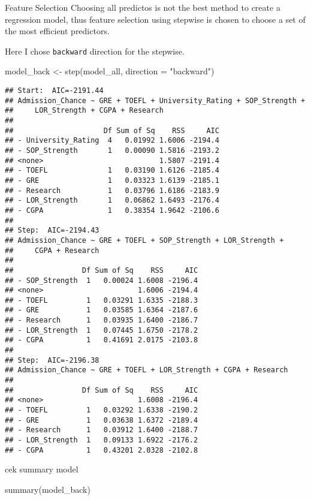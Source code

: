 \documentclass[
  ignorenonframetext,
]{beamer}
\newenvironment{Shaded}{\begin{snugshade}}{\end{snugshade}}
\newcommand{\AttributeTok}[1]{\textcolor[rgb]{0.77,0.63,0.00}{#1}}
\newcommand{\FunctionTok}[1]{\textcolor[rgb]{0.00,0.00,0.00}{#1}}
\newcommand{\NormalTok}[1]{#1}
\newcommand{\OtherTok}[1]{\textcolor[rgb]{0.56,0.35,0.01}{#1}}
\newcommand{\StringTok}[1]{\textcolor[rgb]{0.31,0.60,0.02}{#1}}
\begin{document}
\begin{frame}[fragile]{Feature Selection}
\protect\hypertarget{feature-selection}{}
Choosing all predictos is not the best method to create a regression
model, thus feature selection using stepwise is chosen to choose a set
of the most efficient predictors.

Here I chose \texttt{backward} direction for the stepwise.

\begin{Shaded}
\begin{Highlighting}[]
\NormalTok{model\_back }\OtherTok{\textless{}{-}} \FunctionTok{step}\NormalTok{(model\_all, }\AttributeTok{direction =} \StringTok{"backward"}\NormalTok{)}
\end{Highlighting}
\end{Shaded}

\begin{verbatim}
## Start:  AIC=-2191.44
## Admission_Chance ~ GRE + TOEFL + University_Rating + SOP_Strength + 
##     LOR_Strength + CGPA + Research
## 
##                     Df Sum of Sq    RSS     AIC
## - University_Rating  4   0.01992 1.6006 -2194.4
## - SOP_Strength       1   0.00090 1.5816 -2193.2
## <none>                           1.5807 -2191.4
## - TOEFL              1   0.03190 1.6126 -2185.4
## - GRE                1   0.03323 1.6139 -2185.1
## - Research           1   0.03796 1.6186 -2183.9
## - LOR_Strength       1   0.06862 1.6493 -2176.4
## - CGPA               1   0.38354 1.9642 -2106.6
## 
## Step:  AIC=-2194.43
## Admission_Chance ~ GRE + TOEFL + SOP_Strength + LOR_Strength + 
##     CGPA + Research
## 
##                Df Sum of Sq    RSS     AIC
## - SOP_Strength  1   0.00024 1.6008 -2196.4
## <none>                      1.6006 -2194.4
## - TOEFL         1   0.03291 1.6335 -2188.3
## - GRE           1   0.03585 1.6364 -2187.6
## - Research      1   0.03935 1.6400 -2186.7
## - LOR_Strength  1   0.07445 1.6750 -2178.2
## - CGPA          1   0.41691 2.0175 -2103.8
## 
## Step:  AIC=-2196.38
## Admission_Chance ~ GRE + TOEFL + LOR_Strength + CGPA + Research
## 
##                Df Sum of Sq    RSS     AIC
## <none>                      1.6008 -2196.4
## - TOEFL         1   0.03292 1.6338 -2190.2
## - GRE           1   0.03638 1.6372 -2189.4
## - Research      1   0.03912 1.6400 -2188.7
## - LOR_Strength  1   0.09133 1.6922 -2176.2
## - CGPA          1   0.43201 2.0328 -2102.8
\end{verbatim}

cek summary model

\begin{Shaded}
\begin{Highlighting}[]
\FunctionTok{summary}\NormalTok{(model\_back)}
\end{Highlighting}
\end{Shaded}


\end{frame}
\end{document}

